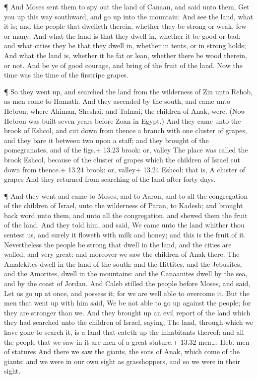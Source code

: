  ¶ And Moses sent them to spy out the land of Canaan, and
said unto them, Get you up this way southward, and go up into the
mountain:  And see the land, what it is; and the people
that dwelleth therein, whether they be strong or weak, few or many;
 And what the land is that they dwell in, whether it be
good or bad; and what cities they be that they dwell in, whether in
tents, or in strong holds;  And what the land is, whether
it be fat or lean, whether there be wood therein, or not. And be ye of
good courage, and bring of the fruit of the land. Now the time was the
time of the firstripe grapes.

 ¶ So they went up, and searched the land from the
wilderness of Zin unto Rehob, as men come to Hamath.  And
they ascended by the south, and came unto Hebron; where Ahiman, Sheshai,
and Talmai, the children of Anak, were. (Now Hebron was built seven
years before Zoan in Egypt.)  And they came unto the brook
of Eshcol, and cut down from thence a branch with one cluster of grapes,
and they bare it between two upon a staff; and they brought of the
pomegranates, and of the figs.+ 13.23 brook: or, valley 
The place was called the brook Eshcol, because of the cluster of grapes
which the children of Israel cut down from thence.+ 13.24 brook: or,
valley+ 13.24 Eshcol: that is, A cluster of grapes  And
they returned from searching of the land after forty days.

 ¶ And they went and came to Moses, and to Aaron, and to
all the congregation of the children of Israel, unto the wilderness of
Paran, to Kadesh; and brought back word unto them, and unto all the
congregation, and shewed them the fruit of the land.  And
they told him, and said, We came unto the land whither thou sentest us,
and surely it floweth with milk and honey; and this is the fruit of it.
 Nevertheless the people be strong that dwell in the land,
and the cities are walled, and very great: and moreover we saw the
children of Anak there.  The Amalekites dwell in the land
of the south: and the Hittites, and the Jebusites, and the Amorites,
dwell in the mountains: and the Canaanites dwell by the sea, and by the
coast of Jordan.  And Caleb stilled the people before
Moses, and said, Let us go up at once, and possess it; for we are well
able to overcome it.  But the men that went up with him
said, We be not able to go up against the people; for they are stronger
than we.  And they brought up an evil report of the land
which they had searched unto the children of Israel, saying, The land,
through which we have gone to search it, is a land that eateth up the
inhabitants thereof; and all the people that we saw in it are men of a
great stature.+ 13.32 men\ldots: Heb. men of statures  And
there we saw the giants, the sons of Anak, which come of the giants: and
we were in our own sight as grasshoppers, and so we were in their sight.

